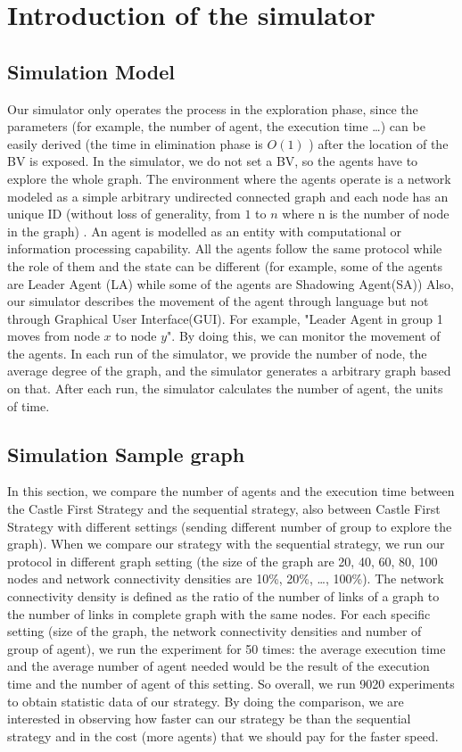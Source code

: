 \section{Introduction of the simulator}
\subsection{Simulation Model}
Our simulator only operates the process in the exploration phase, since the parameters (for example, the number of agent, the execution time \ldots) can be easily derived (the time in elimination phase is $O(1)$ ) after the location of the BV is exposed. In the simulator, we do not set a BV, so the agents have to explore the whole graph. The environment where the agents operate is a network modeled as a simple arbitrary undirected connected graph and each node has an unique ID (without loss of generality, from $1$ to $n$ where n is the number of node in the graph) . An agent is modelled as an entity with computational or information processing capability. All the agents follow the same protocol while the role of them and the state can be different (for example, some of the agents are Leader Agent (LA) while some of the agents are Shadowing Agent(SA)) Also, our simulator describes the movement of the agent through language but not through Graphical User Interface(GUI). For example, "Leader Agent in group 1 moves from node $x$ to node $y$". By doing this, we can monitor the movement of the agents. In each run of the simulator, we provide the number of node, the average degree of the graph, and the simulator generates a arbitrary graph based on that. After each run, the simulator calculates the number of agent, the units of time.          

\subsection{Simulation Sample graph} 
In this section, we compare the number of agents and the execution time between the Castle First Strategy and  the sequential strategy\cite{Cai}, also between Castle First Strategy with different settings (sending different number of group to explore the graph). When we compare our strategy with the sequential strategy, we run our protocol in different graph setting (the size of the graph are 20, 40, 60, 80, 100 nodes and network connectivity densities are 10\%, 20\%, \ldots, 100\%). The network connectivity density is defined as the ratio of the number of links of a graph to the number of links in complete graph with the same nodes. For each specific setting (size of the graph, the network connectivity densities and number of group of agent), we run the experiment for 50 times: the average execution time and the average number of agent needed would be the result of the execution time and the number of agent of this setting. So overall, we run 9020 experiments to obtain statistic data of our strategy. By doing the comparison, we are interested in observing how faster can our strategy be than the sequential strategy and in the cost (more agents) that we should pay for the faster speed. 

